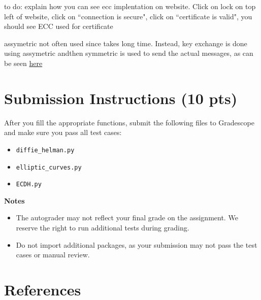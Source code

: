 \documentclass{article}
\begin{document}
    to do: explain how you can see ecc implentation on website. Click on lock on top left of website, click on ``connection is secure", click on ``certificate is valid", you should see ECC used for certificate

    
    assymetric not often used since takes long time. Instead, key exchange is done using assymetric andthen symmetric is used to send the actual messages, as can be seen \href{https://github.com/nakov/Practical-Cryptography-for-Developers-Book/blob/master/asymmetric-key-ciphers/ecc-encryption-decryption.md}{here}


\section*{Submission Instructions (10 pts)}
    After you fill the appropriate functions, submit the following files to Gradescope and make sure you pass all test cases:
    \begin{itemize}
        \item \lstinline{diffie_helman.py}
        \item \lstinline{elliptic_curves.py}
        \item \lstinline{ECDH.py}
    \end{itemize}

    \vspace{3mm}
    \textbf{Notes}
    \begin{itemize}
        \item The autograder may not reflect your final grade on the assignment. We reserve the right to run additional tests during grading.
        \item Do not import additional packages, as your submission may not pass the test cases or manual review.
    \end{itemize}

    

\section*{References}
\end{document}
